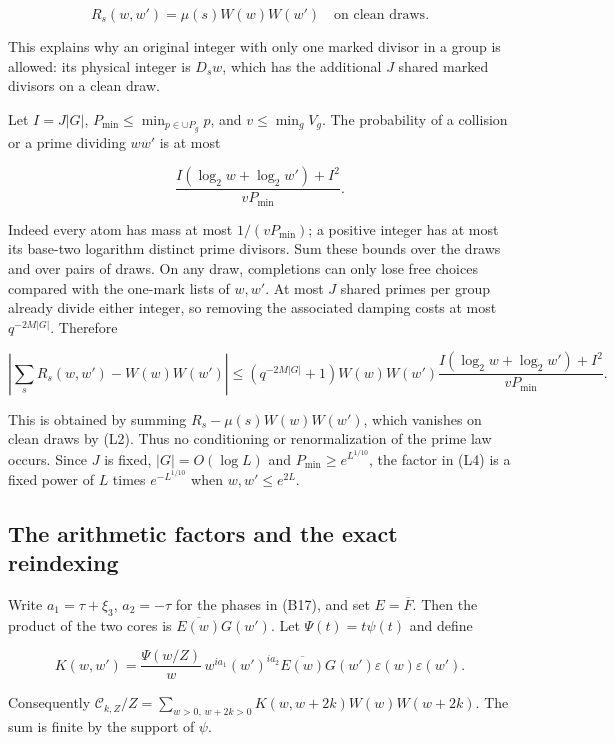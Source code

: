 \[
R_s(w,w')=\mu(s)W(w)W(w')\quad\text{on clean draws}. \tag{L2}
\]

This explains why an original integer with only one marked divisor in a
group is allowed: its physical integer is \(D_sw\), which has the
additional \(J\) shared marked divisors on a clean draw.

Let \(I=J|G|\), \(P_{\min}\le\min_{p\in\cup P_g}p\), and
\(v\le\min_gV_g\). The probability of a collision or a prime dividing
\(ww'\) is at most

\[
\frac{I(\log_2 w+\log_2 w')+I^2}{vP_{\min}}. \tag{L3}
\]

Indeed every atom has mass at most \(1/(vP_{\min})\); a positive integer
has at most its base-two logarithm distinct prime divisors. Sum these
bounds over the draws and over pairs of draws. On any draw, completions
can only lose free choices compared with the one-mark lists of \(w,w'\).
At most \(J\) shared primes per group already divide either integer, so
removing the associated damping costs at most \(q^{-2M|G|}\). Therefore

\[
\left|\sum_sR_s(w,w')-W(w)W(w')\right|
\le(q^{-2M|G|}+1)W(w)W(w')
 \frac{I(\log_2 w+\log_2 w')+I^2}{vP_{\min}}. \tag{L4}
\]

This is obtained by summing \(R_s-\mu(s)W(w)W(w')\), which vanishes on
clean draws by (L2). Thus no conditioning or renormalization of the
prime law occurs. Since \(J\) is fixed, \(|G|=O(\log L)\) and
\(P_{\min}\ge e^{L^{1/10}}\), the factor in (L4) is a fixed power of
\(L\) times \(e^{-L^{1/10}}\) when \(w,w'\le e^{2L}\).


\hypertarget{physical-lift-the-arithmetic-factors-and-the-exact-reindexing}{%
\subsection{The arithmetic factors and the exact
reindexing}\label{physical-lift-the-arithmetic-factors-and-the-exact-reindexing}}

Write \(a_1=\tau+\xi_3\), \(a_2=-\tau\) for the phases in (B17), and set
\(E=\overline F\). Then the product of the two cores is
\(\overline{E(w)}G(w')\). Let \(\Psi(t)=t\psi(t)\) and define

\[
K(w,w')=\frac{\Psi(w/Z)}w\,w^{ia_1}(w')^{ia_2}
 \overline{E(w)}G(w')\varepsilon(w)\varepsilon(w').
\]

Consequently
\(\mathcal C_{k,Z}/Z= \sum_{w>0,\,w+2k>0}K(w,w+2k)W(w)W(w+2k)\). The sum
is finite by the support of \(\psi\).


